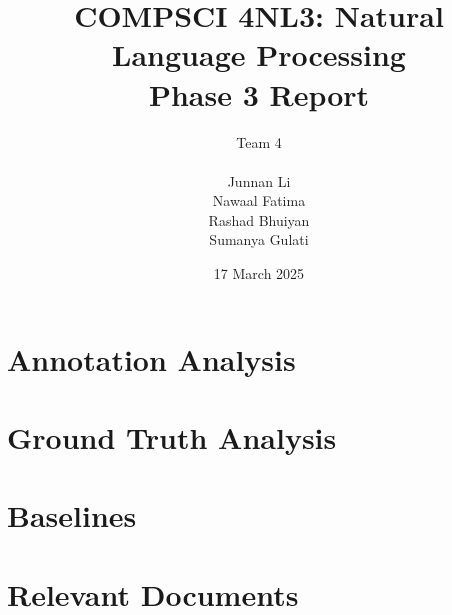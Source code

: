 \documentclass[titlepage]{article}
\title{COMPSCI 4NL3: Natural Language Processing\\
Phase 3 Report}
\author{Team 4\\
\\ Junnan Li
\\ Nawaal Fatima
\\ Rashad Bhuiyan
\\ Sumanya Gulati}
\date{17 March 2025}
\begin{document}
\begin{titlepage}
  \maketitle
\end{titlepage}

\newpage

\tableofcontents

\newpage

\section{Annotation Analysis}

\section{Ground Truth Analysis}

\section{Baselines}

\section{Relevant Documents}
\end{document}
